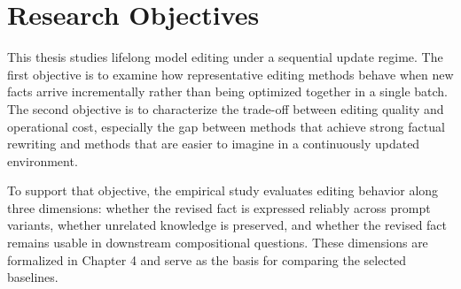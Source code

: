 \section{Research Objectives}

This thesis studies lifelong model editing under a sequential update regime. The first objective is to examine how representative editing methods behave when new facts arrive incrementally rather than being optimized together in a single batch. The second objective is to characterize the trade-off between editing quality and operational cost, especially the gap between methods that achieve strong factual rewriting and methods that are easier to imagine in a continuously updated environment.

To support that objective, the empirical study evaluates editing behavior along three dimensions: whether the revised fact is expressed reliably across prompt variants, whether unrelated knowledge is preserved, and whether the revised fact remains usable in downstream compositional questions. These dimensions are formalized in Chapter 4 and serve as the basis for comparing the selected baselines.
